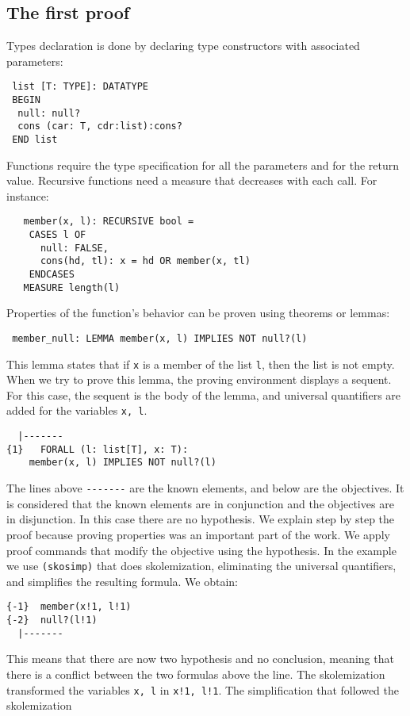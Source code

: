 \documentclass[a4paper,12pt]{article}
\begin{document}
\subsection{The first proof}
Types declaration is done by declaring type constructors with associated parameters:
\begin{verbatim}
 list [T: TYPE]: DATATYPE 
 BEGIN
  null: null?
  cons (car: T, cdr:list):cons?
 END list
\end{verbatim}
Functions require the type specification for all the parameters and for the return value. Recursive 
functions need a measure that decreases with each call. For instance:
\begin{verbatim}
   member(x, l): RECURSIVE bool =
    CASES l OF
      null: FALSE,
      cons(hd, tl): x = hd OR member(x, tl)
    ENDCASES
   MEASURE length(l)
\end{verbatim}
Properties of the function's behavior can be proven using theorems or lemmas:
\begin{verbatim}
 member_null: LEMMA member(x, l) IMPLIES NOT null?(l)
\end{verbatim}
This lemma states that if \verb|x| is a member of the list \verb|l|, then the list is not empty.
When we try to prove this lemma, the proving environment displays a sequent. For this case, the 
sequent is the body of the lemma, and universal quantifiers are added for the variables \verb|x, l|.
\begin{verbatim}
  |-------
{1}   FORALL (l: list[T], x: T): 
	member(x, l) IMPLIES NOT null?(l)
\end{verbatim}
The lines above \verb|-------| are the known elements, and below are the objectives. It is 
considered that the known elements are in conjunction and the objectives are in disjunction. In 
this case there are no hypothesis.
We explain step by step the proof because proving properties was an important part of the work.
We apply proof commands that modify the objective using the hypothesis. In the example we use
\verb|(skosimp)| that does skolemization, eliminating the universal quantifiers, and simplifies
the resulting formula. We obtain:
\begin{verbatim}
{-1}  member(x!1, l!1)
{-2}  null?(l!1)
  |-------
\end{verbatim}
This means that there are now two hypothesis and no conclusion, meaning that there is a conflict
between the two formulas above the line. The skolemization transformed the variables \verb|x, l| in \verb|x!1, l!1|.
The simplification that followed the skolemization 
\end{document}
